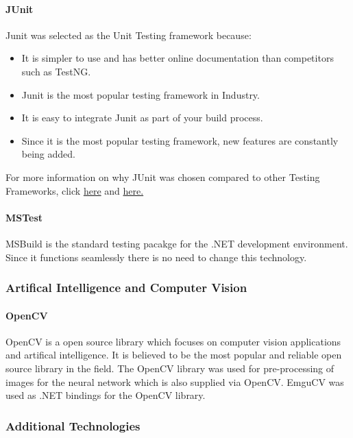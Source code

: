 \documentclass[11pt,a4paper,titlepage]{article}
\begin{document}
			\paragraph{JUnit}
				Junit was selected as the Unit Testing framework because:
					\begin{itemize}	
						\item It is simpler to use and has better online documentation than competitors such as TestNG.
						\item Junit is the most popular testing framework in Industry. 
						\item It is easy to integrate Junit as part of your build process. 
						\item Since it is the most popular testing framework,  new features are constantly  being added.
					\end{itemize}
For more information on why JUnit was chosen compared to other Testing Frameworks, click \href{http://blog.javafortesters.com/2014/09/faq-should-i-use-junit-or-testng-which.html}{here} and
\href{https://seleniumonlinetrainingexpert.wordpress.com/2012/11/21/what-are-advantages-of-testing-with-junit/}{here.} \newline

			\paragraph{MSTest}
				MSBuild is the standard testing pacakge for the .NET development environment. Since it functions seamlessly there is no need to change this technology.
		
	\subsubsection{Artifical Intelligence and Computer Vision}
		\paragraph{OpenCV}
			OpenCV is a open source library which focuses on computer vision applications and artifical intelligence. It is believed to be the most popular and reliable open source library in the field. The OpenCV library was used for pre-processing of images for the neural network which is also supplied via OpenCV. EmguCV was used as .NET bindings for the OpenCV library. 

	\subsubsection{Additional Technologies}
\end{document}
